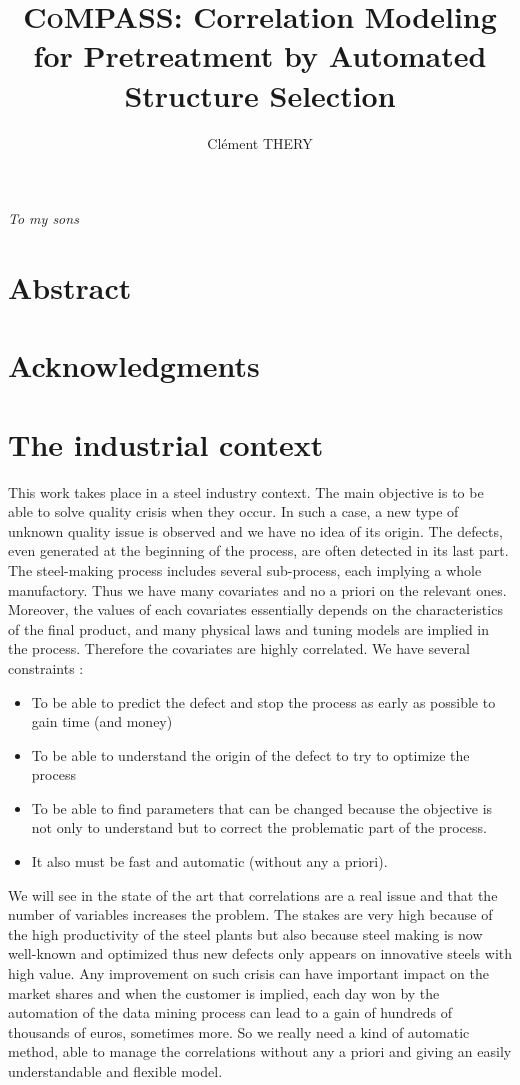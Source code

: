 \documentclass[11pt,a4paper]{report}
\author{Clément THERY}
\title{\textsc{CoMPASS}: \textbf{Co}rrelation \textbf{M}odeling for \textbf{P}retreatment by \textbf{A}utomated \textbf{S}tructure \textbf{S}election}
\begin{document}
\maketitle
\newpage
\itshape To my sons
\upshape
\tableofcontents
\chapter*{Abstract}
\chapter*{Acknowledgments}
\chapter{The industrial context}
	This work takes place in a steel industry context. The main objective is to be able to solve quality crisis when they occur. In such a case, a new type of unknown quality issue is observed and we have no idea of its origin. The defects, even generated at the beginning of the process, are often detected in its last part. The steel-making process includes several sub-process, each implying a whole manufactory. Thus we have many covariates and no a priori on the relevant ones. Moreover, the values of each covariates essentially depends on the characteristics of the final product, and many physical laws and tuning models are implied in the process. Therefore the covariates are highly correlated.
	We have several constraints :
	\begin{itemize}
		\item To be able to predict the defect and stop the process as early as possible to gain time (and money)
		\item To be able to understand the origin of the defect to try to optimize the process
		\item To be able to find parameters that can be changed because the objective is not only to understand but to correct the problematic part of the process.
		\item It also must be fast and automatic (without any a priori).
	\end{itemize}
	We will see in the state of the art that correlations are a real issue and that the number of variables increases the problem.	
	The stakes are very high because of the high productivity of the steel plants but also because steel making is now well-known and optimized thus new defects only appears on innovative steels with high value. Any improvement on such crisis can have important impact on the market shares and when the customer is implied, each day won by the automation of the data mining process can lead to a gain of hundreds of thousands of euros, sometimes more. So we really need a kind of automatic method, able to manage the correlations without any a priori and giving an easily understandable and flexible model.
	
\end{document}

